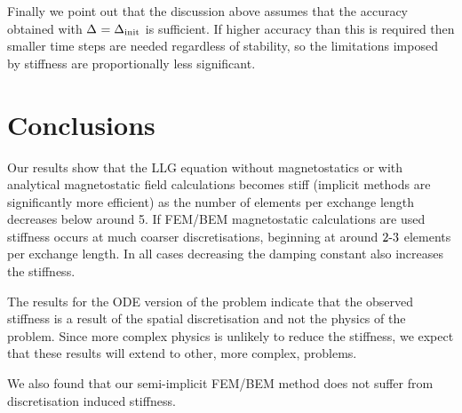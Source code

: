 Finally we point out that the discussion above assumes that the accuracy obtained with $\Delta_{} = \Delta_{\text{init}}$ is sufficient.
If higher accuracy than this is required then smaller time steps are needed regardless of stability, so the limitations imposed by stiffness are proportionally less significant.


\section{Conclusions}
Our results show that the LLG equation without magnetostatics or with analytical magnetostatic field calculations becomes stiff (\ie implicit methods are significantly more efficient) as the number of elements per exchange length decreases below around 5.
If FEM/BEM magnetostatic calculations are used stiffness occurs at much coarser discretisations, beginning at around $2\text{-} 3$ elements per exchange length.
In all cases decreasing the damping constant also increases the stiffness.

The results for the ODE version of the problem indicate that the observed stiffness is a result of the spatial discretisation and not the physics of the problem.
Since more complex physics is unlikely to reduce the stiffness, we expect that these results will extend to other, more complex, problems.

We also found that our semi-implicit FEM/BEM method does not suffer from discretisation induced stiffness.


